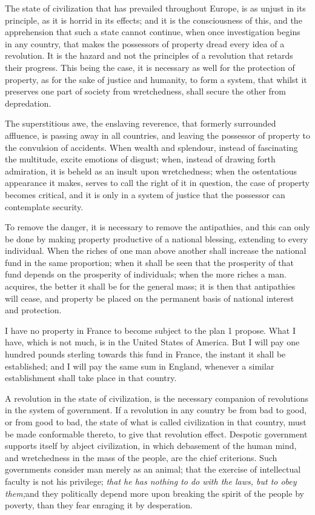 The state of civilization that has prevailed throughout Europe, is as unjust in its principle, as it is horrid in its effects; and it is the consciousness of this, and the apprehension that such a state cannot continue, when once investigation begins in any country, that makes the possessors of property dread every idea of a revolution. It is the hazard and not the principles of a revolution that retards their progress. This being the case, it is necessary as well for the protection of property, as for the sake of justice and humanity, to form a system, that whilst it preserves one part of society from wretchedness, shall secure the other from depredation.

The superstitious awe, the enslaving reverence, that formerly surrounded affluence, is passing away in all countries, and leaving the possessor of property to the convulsion of accidents. When wealth and splendour, instead of fascinating the multitude, excite emotions of disgust; when, instead of drawing forth admiration, it is beheld as an insult upon wretchedness; when the ostentatious appearance it makes, serves to call the right of it in question, the case of property becomes critical, and it is only in a system of justice that the possessor can contemplate security.

To remove the danger, it is necessary to remove the antipathies, and this can only be done by making property productive of a national blessing, extending to every individual. When the riches of one man above another shall increase the national fund in the same proportion; when it shall be seen that the prosperity of that fund depends on the prosperity of individuals; when the more riches a man. acquires, the better it shall be for the general mass; it is then that antipathies will cease, and property be placed on the permanent basis of national interest and protection.

I have no property in France to become subject to the plan 1 propose. What I have, which is not much, is in the United States of America. But I will pay one hundred pounds sterling towards this fund in France, the instant it shall be established; and I will pay the same sum in England, whenever a similar establishment shall take place in that country.

A revolution in the state of civilization, is the necessary companion of revolutions in the system of government. If a revolution in any country be from bad to good, or from good to bad, the state of what is called civilization in that country, must be made conformable thereto, to give that revolution effect. Despotic government supports itself by abject civilization, in which debasement of the human mind, and wretchedness in the mass of the people, are the chief criterions. Such governments consider man merely as an animal; that the exercise of intellectual faculty is not his privilege; \emph{that he has nothing to do with the laws, but to obey them;}\footnotemark[2] and they politically depend more upon breaking the spirit of the people by poverty, than they fear enraging it by desperation.

